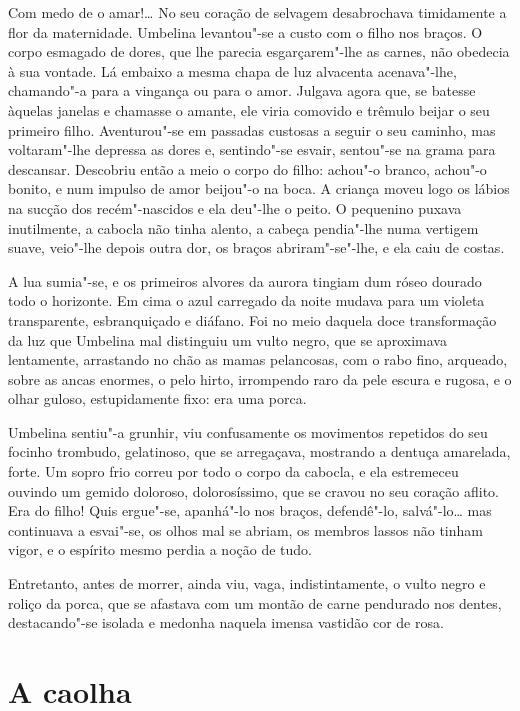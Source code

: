 Com medo de o amar!\ldots{} No seu coração de selvagem desabrochava
timidamente a flor da maternidade. Umbelina levantou"-se a custo com o
filho nos braços. O corpo esmagado de dores, que lhe parecia
esgarçarem"-lhe as carnes, não obedecia à sua vontade. Lá embaixo a mesma
chapa de luz alvacenta acenava"-lhe, chamando"-a para a vingança ou para o
amor. Julgava agora que, se batesse àquelas janelas e chamasse o amante,
ele viria comovido e trêmulo beijar o seu primeiro filho. Aventurou"-se
em passadas custosas a seguir o seu caminho, mas voltaram"-lhe depressa
as dores e, sentindo"-se esvair, sentou"-se na grama para descansar.
Descobriu então a meio o corpo do filho: achou"-o branco, achou"-o bonito,
e num impulso de amor beijou"-o na boca. A criança moveu logo os lábios
na sucção dos recém"-nascidos e ela deu"-lhe o peito. O pequenino puxava
inutilmente, a cabocla não tinha alento, a cabeça pendia"-lhe numa
vertigem suave, veio"-lhe depois outra dor, os braços abriram"-se"-lhe, e
ela caiu de costas.

A lua sumia"-se, e os primeiros alvores da aurora tingiam dum róseo
dourado todo o horizonte. Em cima o azul carregado da noite mudava para
um violeta transparente, esbranquiçado e diáfano. Foi no meio daquela
doce transformação da luz que Umbelina mal distinguiu um vulto negro,
que se aproximava lentamente, arrastando no chão as mamas pelancosas,
com o rabo fino, arqueado, sobre as ancas enormes, o pelo hirto,
irrompendo raro da pele escura e rugosa, e o olhar guloso, estupidamente
fixo: era uma porca.

Umbelina sentiu"-a grunhir, viu confusamente os movimentos repetidos do
seu focinho trombudo, gelatinoso, que se arregaçava, mostrando a dentuça
amarelada, forte. Um sopro frio correu por todo o corpo da cabocla, e
ela estremeceu ouvindo um gemido doloroso, dolorosíssimo, que se cravou
no seu coração aflito. Era do filho! Quis ergue"-se, apanhá"-lo nos
braços, defendê"-lo, salvá"-lo\ldots{} mas continuava a esvai"-se, os olhos mal
se abriam, os membros lassos não tinham vigor, e o espírito mesmo perdia
a noção de tudo.

Entretanto, antes de morrer, ainda viu, vaga, indistintamente, o vulto
negro e roliço da porca, que se afastava com um montão de carne
pendurado nos dentes, destacando"-se isolada e medonha naquela imensa
vastidão cor de rosa.

\chapter{A caolha}

